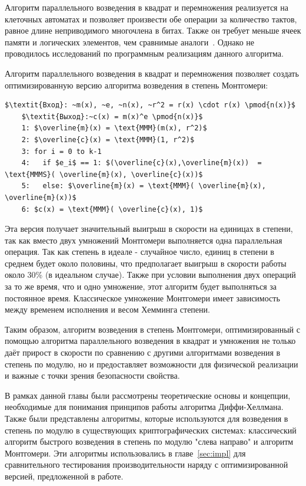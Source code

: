 \documentclass[times,specification,annotation]{itmo-student-thesis}
\begin{document}
Алгоритм параллельного возведения в квадрат и перемножения реализуется на клеточных автоматах и позволяет
произвести обе операции за количество тактов, равное длине неприводимого многочлена в битах.
Также он требует меньше ячеек памяти и логических элементов, чем сравнимые аналоги~\cite{ku04}.
Однако не проводилось исследований по программным реализациям данного алгоритма.

Алгоритм параллельного возведения в квадрат и перемножения позволяет создать оптимизированную версию алгоритма возведения в степень Монтгомери:
\begin{lstlisting}[breaklines=true, mathescape=true]
    $\textit{Вход}: ~m(x), ~e, ~n(x), ~r^2 = r(x) \cdot r(x) \pmod{n(x)}$
    $\textit{Выход}:~c(x) = m(x)^e \pmod{n(x)}$
    1: $\overline{m}(x) = \text{MMM}(m(x), r^2)$
    2: $\overline{c}(x) = \text{MMM}(1, r^2)$
    3: for i = 0 to k-1
    4:   if $e_i$ == 1: $(\overline{c}(x),\overline{m}(x))  = \text{MMMS}( \overline{m}(x), \overline{c}(x))$
    5:   else: $\overline{m}(x) = \text{MMM}( \overline{m}(x), \overline{m}(x))$
    6: $c(x) = \text{MMM}( \overline{c}(x), 1)$
\end{lstlisting}
Эта версия получает значительный выигрыш в скорости на единицах в степени, так как вместо двух
умножений Монтгомери выполняется одна параллельная операция.
Так как степень в идеале - случайное число, единиц в степени в среднем будет около половины,
что предполагает выигрыш в скорости работы около 30\% (в идеальном случае).
Также при условии выполнения двух операций за то же время, что и одно умножение, этот алгоритм будет выполняться за постоянное время.
Классическое умножение Монтгомери имеет зависимость между временем исполнения и весом Хемминга степени.

Таким образом, алгоритм возведения в степень Монтгомери, оптимизированный с помощью алгоритма параллельного возведения
в квадрат и умножения не только даёт прирост в скорости по сравнению с другими алгоритмами
возведения в степень по модулю, но и предоставляет возможности для физической реализации и важные с точки зрения безопасности свойства.

\chapterconclusion

В рамках данной главы были рассмотрены теоретические основы и концепции, необходимые для понимания принципов работы алгоритма Диффи-Хеллмана.
Также были представлены алгоритмы, которые используются для возведения в степень по модулю в существующих криптографических системах:
классический алгоритм быстрого возведения в степень по модулю "слева направо" и алгоритм Монтгомери.
Эти алгоритмы использовались в главе~\ref{sec:impl} для сравнительного тестирования производительности наряду с оптимизированной версией, предложенной в работе.
\end{document}

